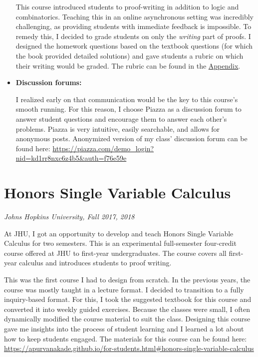 \documentclass[
]{report}
\begin{document}
\begin{itemize}
  This course introduced students to proof-writing in addition to logic and combinatorics. Teaching this in an online asynchronous setting was incredibly challenging, as providing students with immediate feedback is impossible. To remedy this, I decided to grade students on only the \emph{writing} part of proofs.
  I designed the homework questions based on the textbook questions (for which the book provided detailed solutions) and gave students a rubric on which their writing would be graded. The rubric can be found in the \protect\hyperlink{rubric-for-grading-proofs-for-discrete-math-course}{Appendix}.
\item
  \textbf{Discussion forums:}

  I realized early on that communication would be the key to this course's smooth running.
  For this reason, I choose Piazza as a discussion forum to answer student questions and encourage them to answer each other's problems.
  Piazza is very intuitive, easily searchable, and allows for anonymous posts.
  Anonymized version of my class' discussion forum can be found here: \url{https://piazza.com/demo_login?nid=kd1rr8nxc6z4b5\&auth=f76e59e}
\end{itemize}

\hypertarget{honors-single-variable-calculus}{%
\section{Honors Single Variable Calculus}\label{honors-single-variable-calculus}}

\emph{Johns Hopkins University, Fall 2017, 2018}

At JHU, I got an opportunity to develop and teach Honors Single Variable Calculus for two semesters. This is an experimental full-semester four-credit course offered at JHU to first-year undergraduates. The course covers all first-year calculus and introduces students to proof writing.

This was the first course I had to design from scratch.
In the previous years, the course was mostly taught in a lecture format.
I decided to transition to a fully inquiry-based format.
For this, I took the suggested textbook for this course and converted it into weekly guided exercises.
Because the classes were small, I often dynamically modified the course material to suit the class.
Designing this course gave me insights into the process of student learning and I learned a lot about how to keep students engaged.
The materials for this course can be found here: \url{https://apurvanakade.github.io/for-students.html\#honors-single-variable-calculus}
\end{document}
